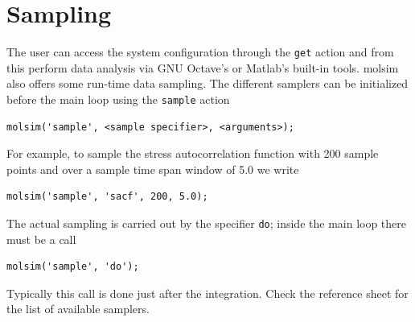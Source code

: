 \documentclass[11pt]{article}
\begin{document}
\section{Sampling}
The user can access the system configuration through the \verb!get! action and
from this perform data analysis via GNU Octave's or Matlab's built-in
tools. \textsf{molsim} also offers some run-time data sampling. The different
samplers can be initialized before the main loop using the \verb!sample! action
\begin{verbatim}
molsim('sample', <sample specifier>, <arguments>);
\end{verbatim}
For example, to sample the stress autocorrelation function with 200 sample points
and over a sample time span window of 5.0 we write
\begin{verbatim}
molsim('sample', 'sacf', 200, 5.0);
\end{verbatim}
The actual sampling is carried out by the specifier \verb!do!; inside the main
loop there must be a call
\begin{verbatim}
molsim('sample', 'do'); 
\end{verbatim}
Typically this call is done just after the integration. Check the reference
sheet for the list of available samplers. 
\end{document}
